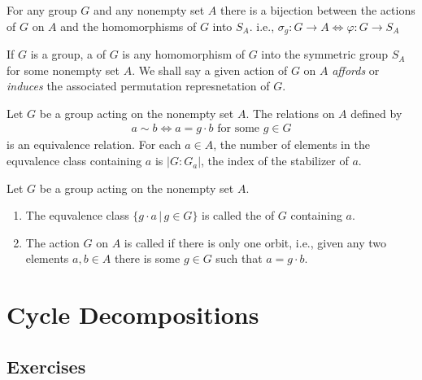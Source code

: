 \documentclass[10pt,a4paper]{report}
\begin{document}
\begin{prop}  For any group $G$ and any nonempty set $A$ there is a bijection between the actions of $G$ on $A$ and the homomorphisms of $G$ into $S_A$.  i.e., $ \sigma_g: G \to A \iff \varphi: G \to S_A$
\end{prop}

\begin{definition} If $G$ is a group, a  of $G$ is any homomorphism of $G$ into the symmetric group $S_A$ for some nonempty set $A$. We shall say a given action of $G$ on $A$ \textit{affords} or \textit{induces} the associated permutation represnetation of $G$.
\end{definition}

\begin{prop}  Let $G$ be a group acting on the nonempty set $A$.  The relations on $A$ defined by
\begin{align*}
	a \sim b \iff a=g\cdot b \text{ for some } g \in G
\end{align*}is an equivalence relation.  For each $a \in A$, the number of elements in the equvalence class containing $a$ is $|G:G_a|$, the index of the stabilizer of $a$.
\end{prop}

\begin{definition}  Let $G$ be a group acting on the nonempty set $A$.
\begin{enumerate}
	\item The equvalence class $\{g\cdot a\,|\, g\in G\}$ is called the  of $G$ containing $a$.
	\item The action $G$ on $A$ is called  if there is only one orbit, i.e., given any two elements $a,b\in A$ there is some $g \in G$ such that $a=g\cdot b$.
\end{enumerate}
\end{definition}

\section{Cycle Decompositions}

\subsection{Exercises}
\end{document}
